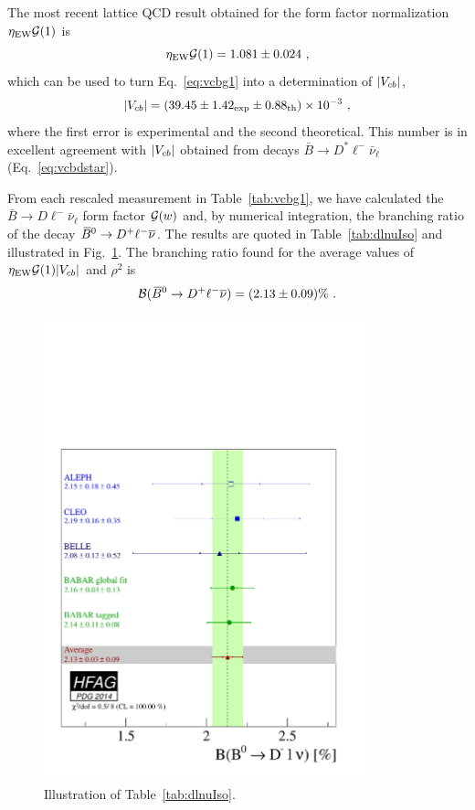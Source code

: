 The most recent lattice QCD result obtained for the form factor
normalization $\eta_\mathrm{EW}{\cal G}(1)$ is~\cite{Okamoto:2004xg}
\begin{equation}
  \eta_\mathrm{EW}{\cal G}(1) = 1.081\pm 0.024~,
\end{equation}
which can be used to turn Eq.~\ref{eq:vcbg1} into a determination of
$|V_{cb}|$,
\begin{equation}
  |V_{cb}| = (39.45\pm 1.42_{\rm exp}\pm 0.88_{\rm th})\times 10^{-3}~,
\end{equation}
where the first error is experimental and the second theoretical. This
number is in excellent agreement with $|V_{cb}|$ obtained from decays
$\bar B\to D^*\ell^-\bar\nu_\ell$ (Eq.~\ref{eq:vcbdstar}).

From each rescaled measurement in Table~\ref{tab:vcbg1}, we have
calculated the $\bar B\to D\ell^-\bar\nu_\ell$ form factor ${\cal
  G}(w)$ and, by numerical integration, the branching ratio of the
decay $\kern 0.18em\overline{\kern -0.18em B}{}^0 \to D^{+}\ell^{-}\overline{\nu}$. The results are quoted in Table~\ref{tab:dlnuIso} and
illustrated in Fig.~\ref{fig:brdlIso}. The branching ratio found for
the average values of $\eta_\mathrm{EW}{\cal G}(1)|V_{cb}|$ and $\rho^2$ is
\begin{equation}
  {\cal B}(\kern 0.18em\overline{\kern -0.18em B}{}^0 \to D^{+}\ell^{-}\overline{\nu})=(2.13\pm 0.09)\%~.
\end{equation}

\begin{figure}[!ht]
  \begin{center}
    \includegraphics[width=9.5cm]{figures/slb/br_dl_iso.pdf}
    \caption{Illustration of Table~\ref{tab:dlnuIso}.} \label{fig:brdlIso}
  \end{center}
\end{figure}

